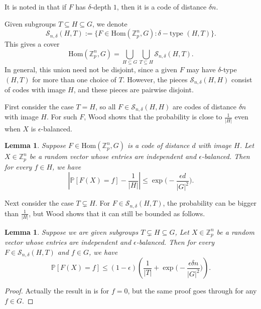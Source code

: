 \documentclass[12pt]{amsart}
\newtheorem{lemma}[theorem]{Lemma}
\theoremstyle{definition}
\newcommand{\PPP}{\mathbb{P}}
\newcommand{\SSS}[3]{\mathcal{S}_{#1}(#2,#3)}
\newcommand{\abs}[1]{\vert#1\vert}
\newcommand{\Zp}{\Z_p}
\newcommand{\Z}{\mathbb{Z}}
\newcommand{\Hom}{\text{Hom}}
\begin{document}
It is noted in \cite[Remark 2.5]{wood2019random} that if $F$ has $\delta$-depth $1$, then it is a code of distance $\delta n$.

Given subgroups $T\subseteq H\subseteq G$, we denote
\[
\SSS{n,\delta}{H}{T}
:=\{F\in \Hom(\Zp^n,G): \delta-\text{type }(H,T)\}.
\]
This gives a cover
\[
\Hom(\Zp^{n},G)
=\bigcup_{H\subseteq G}
\bigcup_{T\subseteq H}
\SSS{n,\delta}{H}{T}.
\]
In general, this union need not be disjoint, since a given $F$ may have $\delta$-type $(H,T)$ for more than one choice of $T$. However, the pieces $\SSS{n,\delta}{H}{H}$ consist of codes with image $H$, and these pieces are pairwise disjoint.

First consider the case $T=H$, so all $F\in \SSS{n,\delta}{H}{H}$ are codes of distance $\delta n$ with image $H$. For such $F$, Wood shows that the probability is close to $\frac{1}{\abs{H}}$ even when $X$ is $\epsilon$-balanced.

\begin{lemma}\cite[Lemma 2.1]{wood2019random}\label{Lem: Wood estimate code}
Suppose $F\in \Hom(\Zp^n,G)$ is a code of distance $d$ with image $H$. Let $X\in\Zp^n$ be a random vector whose entries are independent and $\epsilon$-balanced.
Then for every $f\in H$, we have
\[
\left| \PPP[F(X)=f]-\frac{1}{\abs{H}}\right|
\leq \exp\Big(-\frac{\epsilon d}{|G|^2}\Big).
\]
\end{lemma}





Next consider the case $T\subsetneq H$. For $F\in \SSS{n,\delta}{H}{T}$, the probability can be bigger than $\frac{1}{\abs{H}}$, but  Wood shows that it can still be bounded as follows.

\begin{lemma}\cite[Lemma 2.7]{wood2019random}\label{Lem: Wood bound depth}
Suppose we are given subgroups $T\subsetneq H\subseteq G$,
Let $X\in\Zp^n$ be a random vector whose entries are independent and $\epsilon$-balanced.
Then for every $F\in \SSS{n,\delta}{H}{T}$ and $f\in G$, we have
\[
\PPP[F(X)=f]
\leq (1-\epsilon) 
 \left(\frac{1}{\abs{T}}+\exp\Big(-\frac{\epsilon\delta n}{|G|^2}\Big) \right).
\]
\end{lemma}
\begin{proof}
Actually the result in \cite[Lemma 2.7]{wood2019random} is for $f=0$, but the same proof goes through for any $f\in G$.
\end{proof}
\end{document}
